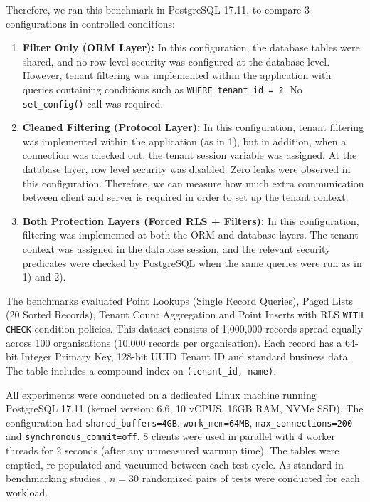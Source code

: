 \documentclass[conference]{IEEEtran}
\begin{document}
Therefore, we ran this benchmark in PostgreSQL 17.11, to compare 3 configurations in controlled conditions:
\begin{enumerate}
\item \textbf{Filter Only (ORM Layer):} In this configuration, the database tables were shared, and no row level security was configured at the database level. However, tenant filtering was implemented within the application with queries containing conditions such as \texttt{WHERE tenant\_id = ?}. No \texttt{set\_config()} call was required.
\item \textbf{Cleaned Filtering (Protocol Layer):} In this configuration, tenant filtering was implemented within the application (as in 1), but in addition, when a connection was checked out, the tenant session variable was assigned. At the database layer, row level security was disabled. Zero leaks were observed in this configuration. Therefore, we can measure how much extra communication between client and server is required in order to set up the tenant context.
\item \textbf{Both Protection Layers (Forced RLS + Filters):} In this configuration, filtering was implemented at both the ORM and database layers. The tenant context was assigned in the database session, and the relevant security predicates were checked by PostgreSQL when the same queries were run as in 1) and 2).
\end{enumerate}

The benchmarks evaluated Point Lookups (Single Record Queries), Paged Lists (20 Sorted Records), Tenant Count Aggregation and Point Inserts with RLS \texttt{WITH CHECK} condition policies. This dataset consists of 1,000,000 records spread equally across 100 organisations (10,000 records per organisation). Each record has a 64-bit Integer Primary Key, 128-bit UUID Tenant ID and standard business data. The table includes a compound index on \texttt{(tenant\_id, name)}.

All experiments were conducted on a dedicated Linux machine running PostgreSQL 17.11 (kernel version: 6.6, 10 vCPUS, 16GB RAM, NVMe SSD). The configuration had \texttt{shared\_buffers=4GB}, \texttt{work\_mem=64MB}, \texttt{max\_connections=200} and \texttt{synchronous\_commit=off}. 8 clients were used in parallel with 4 worker threads for 2 seconds (after any unmeasured warmup time). The tables were emptied, re-populated and vacuumed between each test cycle. As standard in benchmarking studies \cite{georges2007, kalibera2013, mytkowicz2009}, $n=30$ randomized pairs of tests were conducted for each workload.
\end{document}
